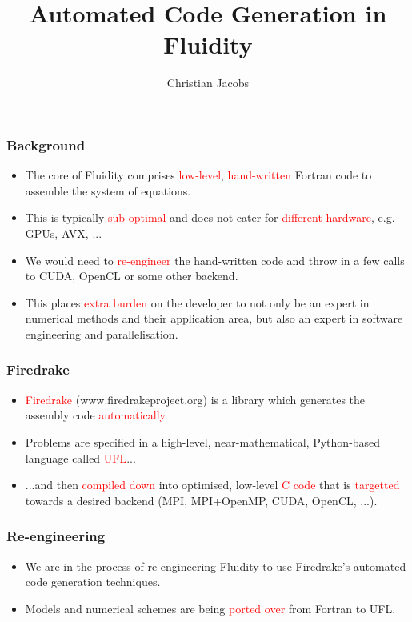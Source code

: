 \documentclass[12pt]{beamer}
\title[Code Generation]{Automated Code Generation in Fluidity}
\subtitle[]{}
\institute{}
\author[Christian Jacobs]{\large{Christian Jacobs}}
\date{}
\begin{document}
\begin{frame}
  \titlepage
\end{frame}

\begin{frame}
    \frametitle{Background}
\begin{itemize}
    \item The core of Fluidity comprises \textcolor{red}{low-level}, \textcolor{red}{hand-written} Fortran code to assemble the system of equations.
    \item This is typically \textcolor{red}{sub-optimal} and does not cater for \textcolor{red}{different hardware}, e.g. GPUs, AVX, ...
    \item We would need to \textcolor{red}{re-engineer} the hand-written code and throw in a few calls to CUDA, OpenCL or some other backend.
    \item This places \textcolor{red}{extra burden} on the developer to not only be an expert in numerical methods and their application area, but also an expert in software engineering and parallelisation.
\end{itemize}
\end{frame}

\begin{frame}
    \frametitle{Firedrake}
\begin{itemize}
    \item \textcolor{red}{Firedrake} (www.firedrakeproject.org) is a library which generates the assembly code \textcolor{red}{automatically}.
    \item Problems are specified in a high-level, near-mathematical, Python-based language called \textcolor{red}{UFL}...
    \item ...and then \textcolor{red}{compiled down} into optimised, low-level \textcolor{red}{C code} that is \textcolor{red}{targetted} towards a desired backend (MPI, MPI+OpenMP, CUDA, OpenCL, ...).
\end{itemize}
\end{frame}

\begin{frame}
    \frametitle{Re-engineering}
\begin{itemize}
    \item We are in the process of re-engineering Fluidity to use Firedrake's automated code generation techniques.
    \item Models and numerical schemes are being \textcolor{red}{ported over} from Fortran to UFL.
\end{itemize}
\end{frame}
\end{document}
